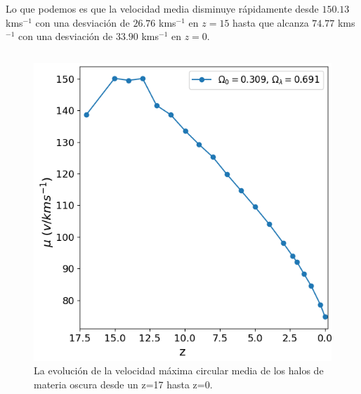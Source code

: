 \documentclass{beamer}
\begin{document}
	\begin{frame}
		\small Lo que podemos es que la velocidad media disminuye rápidamente desde $150.13$ kms$^{-1}$ con una desviación de $26.76$ kms$^{-1}$ en $z=15$ hasta que alcanza $74.77$ kms$^{-1}$ con una desviación de $33.90$ kms$^{-1}$ en $z=0$.
		
		\begin{columns}[t]
			\begin{column}{.5\textwidth}
				\begin{figure}
					\centering
					\includegraphics[scale=0.3]{RunCanonica/VelMax_Mean_RunCanonica.png}
					\caption{\footnotesize La evolución de la velocidad máxima circular media de los halos de materia oscura desde un z=17 hasta z=0.}
					\label{fig:Canon-VelMaxMean}
				\end{figure}
			\end{column}


\end{columns}
\end{frame}
\end{document}
